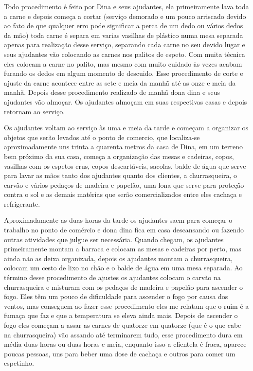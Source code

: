 Todo procedimento é feito por Dina e seus ajudantes, ela primeiramente lava toda 
a carne e depois começa a cortar (serviço demorado e um pouco arriscado devido 
ao fato de que qualquer erro pode significar a perca de um dedo ou vários dedos 
da mão) toda carne é separa em varias vasilhas de plástico numa mesa separada 
apenas para realização desse serviço, separando cada carne no seu devido lugar e 
seus ajudantes vão colocando as carnes nos palitos de espeto. Com muita técnica 
eles colocam a carne no palito, mas mesmo com muito cuidado às vezes acabam 
furando os dedos em algum momento de descuido. Esse procedimento de corte e 
ajuste da carne acontece entre as sete e meia da manhã até as onze e meia da 
manhã. Depois desse procedimento realizado de manhã dona dina e seus ajudantes 
vão almoçar. Os ajudantes almoçam em suas respectivas casas e depois retornam ao 
serviço.

Os ajudantes voltam ao serviço às uma e meia da tarde e começam a organizar os 
objetos que serão levados até o ponto de comercio, que localiza-se 
aproximadamente uns trinta a quarenta metros da casa de Dina, em um terreno bem 
próximo da sua casa, começa a organização das mesas e cadeiras, copos, vasilhas 
com os espetos crus, copos descartáveis, sacolas, balde de água que serve para 
lavar as mãos tanto dos ajudantes quanto dos clientes, a churrasqueira, o carvão 
e vários pedaços de madeira e papelão, uma lona que serve para proteção contra o 
sol e as demais matérias que serão comercializados entre eles cachaça e 
refrigerante. 

Aproximadamente as duas horas da tarde os ajudantes saem para começar o trabalho 
no ponto de comércio e dona dina fica em casa descansando ou fazendo outras 
atividades que julgue ser necessária. Quando chegam, os ajudantes primeiramente 
montam a barraca e colocam as mesas e cadeiras por perto, mas ainda não as deixa 
organizada, depois os ajudantes montam a churrasqueira, colocam um cesto de lixo 
no chão e o balde de água em uma mesa separada. Ao término desse procedimento de 
ajustes os ajudantes colocam o carvão na churrasqueira e misturam com os pedaços 
de madeira e papelão para ascender o fogo. Eles têm um pouco de dificuldade para 
ascender o fogo por causa dos ventos, mas conseguem ao fazer esse procedimento 
eles me relatam que o ruim é a fumaça que faz e que a temperatura se eleva ainda 
mais. Depois de ascender o fogo eles começam a assar as carnes de quatorze em 
quatorze (que é o que cabe na churrasqueira) vão assando até terminarem tudo, 
esse procedimento dura em média duas horas ou duas horas e meia, enquanto isso a 
clientela é fraca, aparece poucas pessoas, uns para beber uma dose de cachaça e 
outros para comer um espetinho. 

